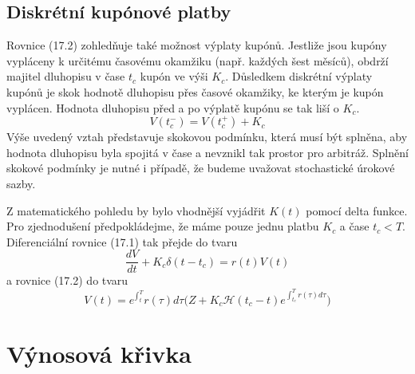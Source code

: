 \documentclass[a4paper]{book}
\begin{document}
\subsection{Diskrétní kupónové platby}

Rovnice (17.2) zohledňuje také možnost výplaty kupónů. Jestliže jsou kupóny vypláceny k určitému časovému okamžiku (např. každých šest měsíců), obdrží majitel dluhopisu v čase $t_c$ kupón ve výši $K_c$. Důsledkem diskrétní výplaty kupónů je skok hodnotě dluhopisu přes časové okamžiky, ke kterým je kupón vyplácen. Hodnota dluhopisu před a po výplatě kupónu se tak liší o $K_c$.
\begin{equation*}
V(t_c^-) = V(t_c^+) + K_c
\end{equation*}
Výše uvedený vztah představuje skokovou podmínku, která musí být splněna, aby hodnota dluhopisu byla spojitá v čase a nevznikl tak prostor pro arbitráž. Splnění skokové podmínky je nutné i případě, že budeme uvažovat stochastické úrokové sazby.

Z matematického pohledu by bylo vhodnější vyjádřit $K(t)$ pomocí delta funkce. Pro zjednodušení předpokládejme, že máme pouze jednu platbu $K_c$ a čase $t_c < T$. Diferenciální rovnice (17.1) tak přejde do tvaru
\begin{equation}
\frac{dV}{dt} + K_c \delta(t - t_c) = r(t)V(t)
\end{equation}
a rovnice (17.2) do tvaru
\begin{equation*}
V(t) = e^{\int_t^T}r(\tau) d \tau \Bigg(Z + K_c \mathcal{H}(t_c - t)e^{\int_{t_c}^T r(\tau) d \tau}\Bigg)
\end{equation*}

\section{Výnosová křivka}
\end{document}

